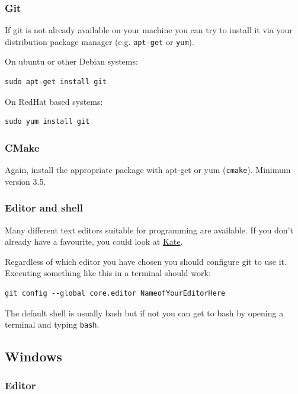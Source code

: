 \subsubsection{Git}\label{git-1}

If git is not already available on your machine you can try to install
it via your distribution package manager (e.g. \texttt{apt-get} or
\texttt{yum}).

On ubuntu or other Debian systems:

\begin{verbatim}
sudo apt-get install git
\end{verbatim}

On RedHat based systems:

\begin{verbatim}
sudo yum install git
\end{verbatim}

\subsubsection{CMake}\label{cmake-1}

Again, install the appropriate package with apt-get or yum
(\texttt{cmake}). Minimum version 3.5.

\subsubsection{Editor and shell}\label{editor-and-shell}

Many different text editors suitable for programming are available. If
you don't already have a favourite, you could look at
\href{http://kate-editor.org/}{Kate}.

Regardless of which editor you have chosen you should configure git to
use it. Executing something like this in a terminal should work:

\begin{verbatim}
git config --global core.editor NameofYourEditorHere
\end{verbatim}

The default shell is usually bash but if not you can get to bash by
opening a terminal and typing \texttt{bash}.

\subsection{Windows}\label{windows-1}

\subsubsection{Editor}\label{editor}

